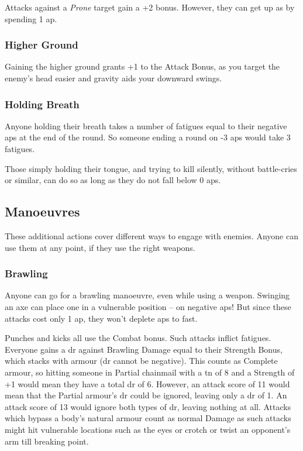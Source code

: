 \begin{multicols}{2}
Attacks against a \textit{Prone} target gain a +2 bonus.
However, they can get up as by spending 1 \gls{ap}.

\subsubsection[+1 to attack]{Higher Ground}

Gaining the higher ground grants +1 to the Attack Bonus, as you target the enemy's head easier and gravity aids your downward swings.

\subsubsection[Holding Breath: 1 \glsentrytext{fatigue} per negative \glsentrytext{ap} at the end of the round]{Holding Breath}
\label{holdingBreath}

Anyone holding their breath takes a number of \glspl{fatigue} equal to their negative \glspl{ap} at the end of the round.
So someone ending a round on -3 \glspl{ap} would take 3 \glspl{fatigue}.

Those simply holding their tongue, and trying to kill silently, without battle-cries or similar, can do so as long as they do not fall below 0 \glspl{ap}.

\subsection{Manoeuvres}

These additional actions cover different ways to engage with enemies.
Anyone can use them at any point, if they use the right weapons.

\subsubsection[Brawling: Make a normal attack roll, but any attack with a Margin less than 5 only inflicts \glspl{fatigue} rather than Damage]{Brawling}

Anyone can go for a brawling manoeuvre, even while using a weapon.
Swinging an axe can place one in a vulnerable position -- on negative \glspl{ap}!
But since these attacks cost only 1 \gls{ap}, they won't deplete \glspl{ap} to fast.

Punches and kicks all use the Combat bonus.
Such attacks inflict \glspl{fatigue}.
Everyone gains a \gls{dr} against Brawling Damage equal to their Strength Bonus, which stacks with armour (\gls{dr} cannot be negative).
This counts as Complete armour, so hitting someone in Partial chainmail with a \gls{tn} of 8 and a Strength of +1 would mean they have a total \gls{dr} of 6.
However, an attack score of 11 would mean that the Partial armour's \gls{dr} could be ignored, leaving only a \gls{dr} of 1.
An attack score of 13 would ignore both types of \gls{dr}, leaving nothing at all.
Attacks which bypass a body's natural armour count as normal Damage as such attacks might hit vulnerable locations such as the eyes or crotch or twist an opponent's arm till breaking point.


\end{multicols}
